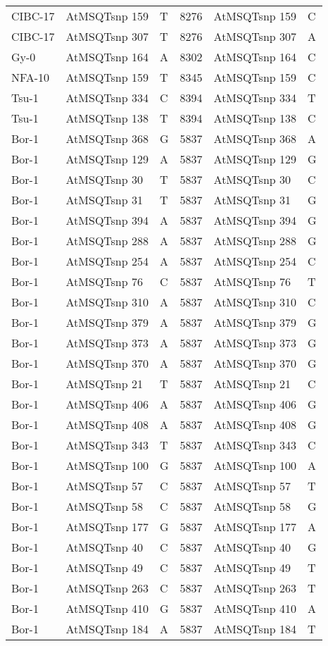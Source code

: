 \begin{center}
\begin{longtable}{|l|l|l|l|l|l|}
CIBC-17&AtMSQTsnp 159&T&8276&AtMSQTsnp 159&C\\
CIBC-17&AtMSQTsnp 307&T&8276&AtMSQTsnp 307&A\\
Gy-0&AtMSQTsnp 164&A&8302&AtMSQTsnp 164&C\\
NFA-10&AtMSQTsnp 159&T&8345&AtMSQTsnp 159&C\\
Tsu-1&AtMSQTsnp 334&C&8394&AtMSQTsnp 334&T\\
Tsu-1&AtMSQTsnp 138&T&8394&AtMSQTsnp 138&C\\
Bor-1&AtMSQTsnp 368&G&5837&AtMSQTsnp 368&A\\
Bor-1&AtMSQTsnp 129&A&5837&AtMSQTsnp 129&G\\
Bor-1&AtMSQTsnp 30&T&5837&AtMSQTsnp 30&C\\
Bor-1&AtMSQTsnp 31&T&5837&AtMSQTsnp 31&G\\
Bor-1&AtMSQTsnp 394&A&5837&AtMSQTsnp 394&G\\
Bor-1&AtMSQTsnp 288&A&5837&AtMSQTsnp 288&G\\
Bor-1&AtMSQTsnp 254&A&5837&AtMSQTsnp 254&C\\
Bor-1&AtMSQTsnp 76&C&5837&AtMSQTsnp 76&T\\
Bor-1&AtMSQTsnp 310&A&5837&AtMSQTsnp 310&C\\
Bor-1&AtMSQTsnp 379&A&5837&AtMSQTsnp 379&G\\
Bor-1&AtMSQTsnp 373&A&5837&AtMSQTsnp 373&G\\
Bor-1&AtMSQTsnp 370&A&5837&AtMSQTsnp 370&G\\
Bor-1&AtMSQTsnp 21&T&5837&AtMSQTsnp 21&C\\
Bor-1&AtMSQTsnp 406&A&5837&AtMSQTsnp 406&G\\
Bor-1&AtMSQTsnp 408&A&5837&AtMSQTsnp 408&G\\
Bor-1&AtMSQTsnp 343&T&5837&AtMSQTsnp 343&C\\
Bor-1&AtMSQTsnp 100&G&5837&AtMSQTsnp 100&A\\
Bor-1&AtMSQTsnp 57&C&5837&AtMSQTsnp 57&T\\
Bor-1&AtMSQTsnp 58&C&5837&AtMSQTsnp 58&G\\
Bor-1&AtMSQTsnp 177&G&5837&AtMSQTsnp 177&A\\
Bor-1&AtMSQTsnp 40&C&5837&AtMSQTsnp 40&G\\
Bor-1&AtMSQTsnp 49&C&5837&AtMSQTsnp 49&T\\
Bor-1&AtMSQTsnp 263&C&5837&AtMSQTsnp 263&T\\
Bor-1&AtMSQTsnp 410&G&5837&AtMSQTsnp 410&A\\
Bor-1&AtMSQTsnp 184&A&5837&AtMSQTsnp 184&T\\

\end{longtable}
\end{center}
